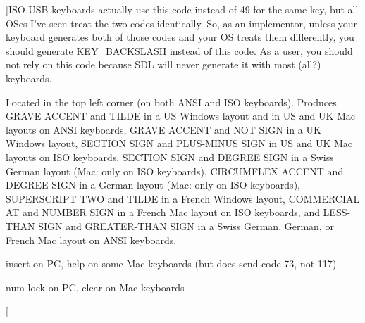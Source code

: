 \begin{Desc}
\begin{description}
{}]ISO USB keyboards actually use this code instead of 49 for the same key, but all OSes I've seen treat the two codes identically. So, as an implementor, unless your keyboard generates both of those codes and your OS treats them differently, you should generate KEY\_\-BACKSLASH instead of this code. As a user, you should not rely on this code because SDL will never generate it with most (all?) keyboards. \item[{\em 
\hypertarget{classMezzanine_1_1MetaCode_a3b5633f0145bf3287cf53a3f05b5563cac09a9343ad1a7c1833450656a354b937}{
KEY\_\-GRAVE}
\label{classMezzanine_1_1MetaCode_a3b5633f0145bf3287cf53a3f05b5563cac09a9343ad1a7c1833450656a354b937}
}]Located in the top left corner (on both ANSI and ISO keyboards). Produces GRAVE ACCENT and TILDE in a US Windows layout and in US and UK Mac layouts on ANSI keyboards, GRAVE ACCENT and NOT SIGN in a UK Windows layout, SECTION SIGN and PLUS-\/MINUS SIGN in US and UK Mac layouts on ISO keyboards, SECTION SIGN and DEGREE SIGN in a Swiss German layout (Mac: only on ISO keyboards), CIRCUMFLEX ACCENT and DEGREE SIGN in a German layout (Mac: only on ISO keyboards), SUPERSCRIPT TWO and TILDE in a French Windows layout, COMMERCIAL AT and NUMBER SIGN in a French Mac layout on ISO keyboards, and LESS-\/THAN SIGN and GREATER-\/THAN SIGN in a Swiss German, German, or French Mac layout on ANSI keyboards. \item[{\em 
\hypertarget{classMezzanine_1_1MetaCode_a3b5633f0145bf3287cf53a3f05b5563ca68b4c9fab606ba7faec021605586da3c}{
KEY\_\-INSERT}
\label{classMezzanine_1_1MetaCode_a3b5633f0145bf3287cf53a3f05b5563ca68b4c9fab606ba7faec021605586da3c}
}]insert on PC, help on some Mac keyboards (but does send code 73, not 117) \item[{\em 
\hypertarget{classMezzanine_1_1MetaCode_a3b5633f0145bf3287cf53a3f05b5563ca7539840a607d5aa419425f2038170212}{
KEY\_\-NUMLOCKCLEAR}
\label{classMezzanine_1_1MetaCode_a3b5633f0145bf3287cf53a3f05b5563ca7539840a607d5aa419425f2038170212}
}]num lock on PC, clear on Mac keyboards \item[{\em 
}
\end{description}
\end{Desc}

